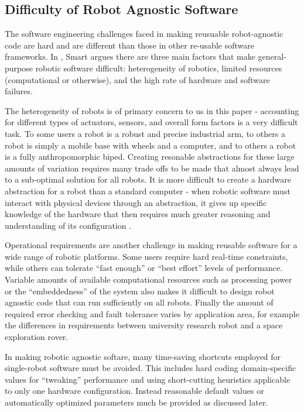 \documentclass[10pt,journal,compsoc]{joser1}
\begin{document}
{%
\subsection{Difficulty of Robot Agnostic Software}

The software engineering challenges faced in making reusuable robot-agnostic code are hard and are different than those in other re-usable software frameworks. In \cite{smart2007common}, Smart argues there are three main factors that make general-purpose robotic software difficult: heterogeneity of robotics, limited resources (computational or otherwise), and the high rate of hardware and software failures. 

The heterogeneity of robots is of primary concern to us in this paper - accounting for different types of actuators, sensors, and overall form factors is a very difficult task. To some users a robot is a robust and precise industrial arm, to others a robot is simply a mobile base with wheels and a computer, and to others a robot is a fully anthropomorphic biped. Creating resonable abstractions for these large amounts of variation requires many trade offs to be made that almost always lead to a sub-optimal solution for all robots. It is more difficult to create a hardware abstraction for a robot than a standard computer - when robotic software must interact with physical devices through an abstraction, it gives up specific knowledge of the hardware that then requires much greater reasoning and understanding of its configuration \cite{smart2007common}.

Operational requirements are another challenge in making reusable software for a wide range of robotic platforms. Some users require hard real-time constraints, while others can tolerate ``fast enough'' or ``best effort'' levels of performance. Variable amounts of available computational resources such as processing power or the ``embeddedness'' of the system also makes it difficult to design robot agnostic code that can run sufficiently on all robots. Finally the amount of required error checking and fault tolerance varies by application area, for example the differences in requirements between university research robot and a space exploration rover.

In making robotic agnostic softare, many time-saving shortcuts employed for single-robot software must be avoided. This includes hard coding domain-specific values for ``tweaking'' performance and using short-cutting heuristics applicable to only one hardware configuration. Instead reasonable default values or automatically optimized parameters much be provided as discussed later. 

}
\end{document}
